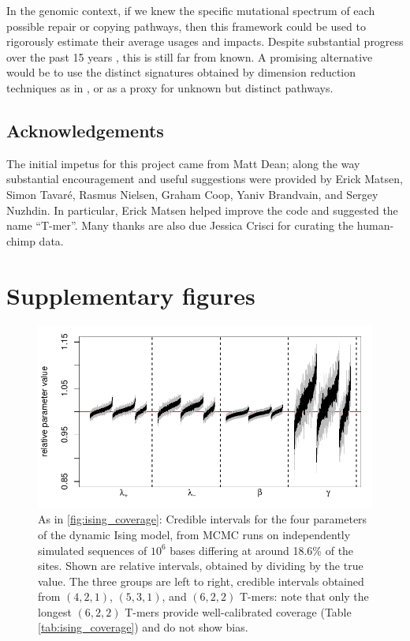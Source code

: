 \documentclass{article}
\theoremstyle{plain}
\theoremstyle{definition}
\begin{document}
In the genomic context,
if we knew the specific mutational spectrum of each possible repair or copying pathways,
then this framework could be used to rigorously estimate their average usages and impacts.
Despite substantial progress over the past 15 years \citep{polymerase_reviews},
this is still far from known.
A promising alternative would be to use the distinct signatures obtained by dimension reduction techniques as in
\citet{cancer_scan}, \citep{matthieson} or \citep{pritchard} as a proxy for unknown but distinct pathways.


\subsection{Acknowledgements}
The initial impetus for this project came from Matt Dean; 
along the way substantial encouragement and useful suggestions were provided by
Erick Matsen, Simon Tavar\'e, Rasmus Nielsen, Graham Coop, Yaniv Brandvain, and Sergey Nuzhdin.
In particular, Erick Matsen helped improve the code and suggested the name ``T-mer''.
Many thanks are also due Jessica Crisci for curating the human-chimp data.



\appendix

\section{Supplementary figures}

\begin{figure}
    \begin{center} 
        \includegraphics{writeup-plots/coverage_results_all}
    \end{center} 
    \caption{
        As in \ref{fig:ising_coverage}:
        Credible intervals for the four parameters of the dynamic Ising model,
        from MCMC runs on independently simulated sequences of $10^6$ bases
        differing at around 18.6\% of the sites.
        Shown are relative intervals, obtained by dividing by the true value.
        The three groups are left to right, credible intervals obtained from $(4,2,1)$, $(5,3,1)$, and $(6,2,2)$ T-mers:
        note that only the longest $(6,2,2)$ T-mers provide well-calibrated coverage (Table \ref{tab:ising_coverage})
        and do not show bias.
        \label{fig:all_ising_coverage}}
\end{figure}
\end{document}
